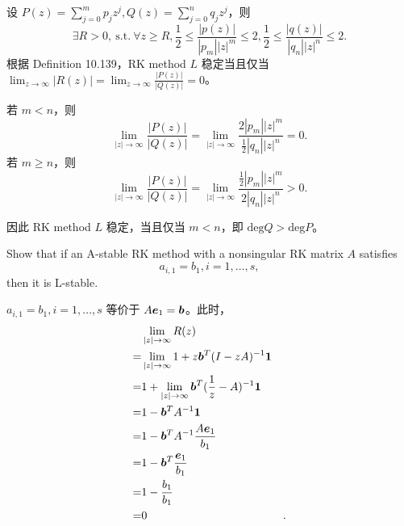 \documentclass[lang=cn,a4paper,newtx,bibend=bibtex]{elegantpaper}
\begin{document}
\begin{solution}
  设 $P(z) = \sum_{j=0}^m p_jz^j, Q(z) = \sum_{j=0}^n q_jz^j$，则
  \begin{equation}
    \exists R>0, ~\mathrm{s.t.}~ 
    \forall z\geq R, \dfrac 12\leq \dfrac{|p(z)|}{|p_m||z|^m}\leq 2, \dfrac 12\leq \dfrac{|q(z)|}{|q_n||z|^n}\leq 2.
  \end{equation}
  根据 Definition 10.139，RK method $L$ 稳定当且仅当 $\lim_{z\rightarrow \infty} |R(z)| = \lim_{z\rightarrow \infty} \frac{|P(z)|}{|Q(z)|} = 0$。

  若 $m<n$，则
  \begin{equation}
    \lim_{|z|\rightarrow \infty} \dfrac{|P(z)|}{|Q(z)|} = \lim_{|z|\rightarrow \infty} \dfrac{2|p_m||z|^m}{\frac 12|q_n||z|^n} = 0.
  \end{equation}
  若 $m\geq n$，则
  \begin{equation}
    \lim_{|z|\rightarrow \infty} \dfrac{|P(z)|}{|Q(z)|} = \lim_{|z|\rightarrow \infty} \dfrac{\frac 12|p_m||z|^m}{2|q_n||z|^n} > 0.
  \end{equation}

  因此 RK method $L$ 稳定，当且仅当 $m<n$，即 $\mathrm{deg} Q > \mathrm{deg} P$。
\end{solution}

\begin{prob}[Exercise 10.215]
  Show that if an A-stable RK method with a nonsingular RK matrix $A$ satisfies
  \begin{equation*}
    a_{i,1} = b_1, i = 1,\dots,s,
  \end{equation*}
  then it is L-stable.
\end{prob}

\begin{solution}
  $a_{i,1} = b_1, i = 1,\dots,s$ 等价于 $A\bm{e}_1 = \bm{b}$。此时，
  \begin{equation*}
    \begin{aligned}      
      & \lim_{|z|\rightarrow \infty} R(z) & \\
      = & \lim_{|z|\rightarrow \infty} 1+z\bm{b}^T(I-zA)^{-1}\bm{1} & \\
      = & 1 + \lim_{|z|\rightarrow \infty} \bm{b}^T(\frac 1z - A)^{-1}\bm{1} & \\
      = & 1 - \bm{b}^T A^{-1}\bm{1} & \\
      = & 1 - \bm{b}^T A^{-1}\frac{A\bm{e}_1}{b_1} & \\
      = & 1 - \bm{b}^T \frac{\bm{e}_1}{b_1} & \\
      = & 1 - \frac{b_1}{b_1} & \\
      = & 0 &. \\
    \end{aligned}
  \end{equation*}
\end{solution}
\end{document}
